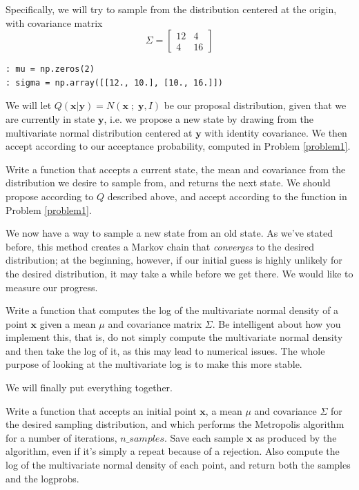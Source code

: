 Specifically, we will try to sample from the distribution centered at the origin, with covariance matrix
\begin{equation*}
\Sigma = \left[ \begin{array}{cc} 12 & 4 \\ 4 & 16 \end{array} \right]
\end{equation*}

\begin{lstlisting}
: mu = np.zeros(2)
: sigma = np.array([[12., 10.], [10., 16.]])
\end{lstlisting}

We will let $Q(\mathbf{x} | \mathbf{y}) = N(\mathbf{x} \; ; \; \mathbf{y}, I)$ be our proposal distribution, given that we are currently in state $\mathbf{y}$, i.e. we propose a new state by drawing from the multivariate normal distribution centered at $\mathbf{y}$ with identity covariance. We then accept according to our acceptance probability, computed in Problem \ref{problem1}.

\begin{problem}
Write a function that accepts a current state, the mean and covariance from the distribution we desire to sample from, and returns the next state. We should propose according to $Q$ described above, and accept according to the function in Problem \ref{problem1}.
\end{problem}

We now have a way to sample a new state from an old state. As we've stated before, this method creates a Markov chain that \emph{converges} to the desired distribution; at the beginning, however, if our initial guess is highly unlikely for the desired distribution, it may take a while before we get there. We would like to measure our progress.

\begin{problem}
Write a function that computes the log of the multivariate normal density of a point $\mathbf{x}$ given a mean $\mu$ and covariance matrix $\Sigma$. Be intelligent about how you implement this, that is, do not simply compute the multivariate normal density and then take the log of it, as this may lead to numerical issues. The whole purpose of looking at the multivariate log is to make this more stable.
\end{problem}

We will finally put everything together.

\begin{problem}
Write a function that accepts an initial point $\mathbf{x}$, a mean $\mu$ and covariance $\Sigma$ for the desired sampling distribution, and which performs the Metropolis algorithm for a number of iterations, $n\_samples$. Save each sample $\mathbf{x}$ as produced by the algorithm, even if it's simply a repeat because of a rejection. Also compute the log of the multivariate normal density of each point, and return both the samples and the logprobs.
\end{problem}

